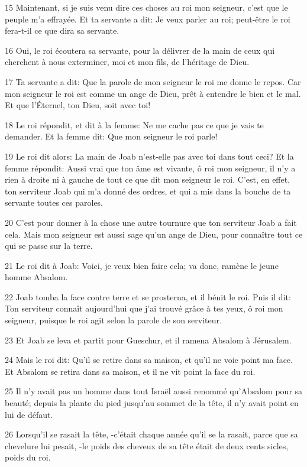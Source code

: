 \par 15 Maintenant, si je suis venu dire ces choses au roi mon seigneur, c'est que le peuple m'a effrayée. Et ta servante a dit: Je veux parler au roi; peut-être le roi fera-t-il ce que dira sa servante.
\par 16 Oui, le roi écoutera sa servante, pour la délivrer de la main de ceux qui cherchent à nous exterminer, moi et mon fils, de l'héritage de Dieu.
\par 17 Ta servante a dit: Que la parole de mon seigneur le roi me donne le repos. Car mon seigneur le roi est comme un ange de Dieu, prêt à entendre le bien et le mal. Et que l'Éternel, ton Dieu, soit avec toi!
\par 18 Le roi répondit, et dit à la femme: Ne me cache pas ce que je vais te demander. Et la femme dit: Que mon seigneur le roi parle!
\par 19 Le roi dit alors: La main de Joab n'est-elle pas avec toi dans tout ceci? Et la femme répondit: Aussi vrai que ton âme est vivante, ô roi mon seigneur, il n'y a rien à droite ni à gauche de tout ce que dit mon seigneur le roi. C'est, en effet, ton serviteur Joab qui m'a donné des ordres, et qui a mis dans la bouche de ta servante toutes ces paroles.
\par 20 C'est pour donner à la chose une autre tournure que ton serviteur Joab a fait cela. Mais mon seigneur est aussi sage qu'un ange de Dieu, pour connaître tout ce qui se passe sur la terre.
\par 21 Le roi dit à Joab: Voici, je veux bien faire cela; va donc, ramène le jeune homme Absalom.
\par 22 Joab tomba la face contre terre et se prosterna, et il bénit le roi. Puis il dit: Ton serviteur connaît aujourd'hui que j'ai trouvé grâce à tes yeux, ô roi mon seigneur, puisque le roi agit selon la parole de son serviteur.
\par 23 Et Joab se leva et partit pour Gueschur, et il ramena Absalom à Jérusalem.
\par 24 Mais le roi dit: Qu'il se retire dans sa maison, et qu'il ne voie point ma face. Et Absalom se retira dans sa maison, et il ne vit point la face du roi.
\par 25 Il n'y avait pas un homme dans tout Israël aussi renommé qu'Absalom pour sa beauté; depuis la plante du pied jusqu'au sommet de la tête, il n'y avait point en lui de défaut.
\par 26 Lorsqu'il se rasait la tête, -c'était chaque année qu'il se la rasait, parce que sa chevelure lui pesait, -le poids des cheveux de sa tête était de deux cents sicles, poids du roi.
